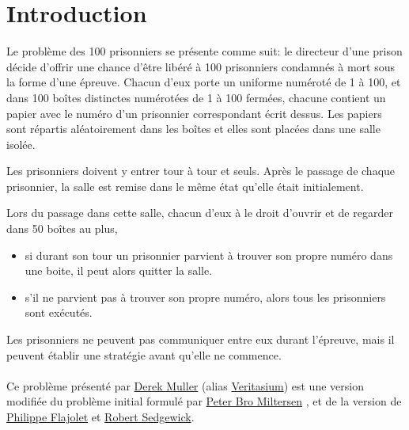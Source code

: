 \section{Introduction}

Le problème des 100 prisonniers \cite{100PrisonersProblem2023} se présente
comme suit:
le directeur d'une prison décide d'offrir une chance d'être libéré à 100 prisonniers
condamnés à mort sous la forme d'une épreuve.
Chacun d'eux porte un uniforme numéroté de 1 à 100, et dans 100 boîtes distinctes
numérotées de 1 à 100 fermées, chacune contient un papier avec le numéro d'un
prisonnier correspondant écrit dessus.
Les papiers sont répartis aléatoirement dans les boîtes et elles sont placées dans une
salle isolée.

Les prisonniers doivent y entrer tour à tour et seuls.
Après le passage de chaque prisonnier, la salle est remise dans le même
état qu'elle était initialement.

Lors du passage dans cette salle, chacun d'eux à le droit d'ouvrir
et de regarder dans 50 boîtes au plus,

\begin{itemize}
	\item
	      si durant son tour un prisonnier parvient à trouver son propre numéro
	      dans une boite, il peut alors quitter la salle.
	\item
	      s'il ne parvient pas à trouver son propre numéro, alors tous les
	      prisonniers sont exécutés.
\end{itemize}

Les prisonniers ne peuvent pas communiquer entre eux durant l'épreuve,
mais il peuvent établir une stratégie avant qu'elle ne commence.\\\\
Ce problème présenté \cite{veritasiumRiddleThatSeems2022} par
\href{https://www.veritasium.com/about}{Derek Muller}
(alias \href{https://www.youtube.com/@veritasium}{Veritasium})
est une version modifiée du problème
initial \cite{miltersenCellProbeComplexity2007} formulé par
\href{https://pure.au.dk/portal/en/persons/bromille%40cs.au.dk}{Peter Bro Miltersen}
, et de la version \cite{flajoletAnalyticCombinatorics2009} de
\href{https://fr.wikipedia.org/wiki/Philippe_Flajolet}{Philippe Flajolet}
et \href{https://sedgewick.io/}{Robert Sedgewick}.

